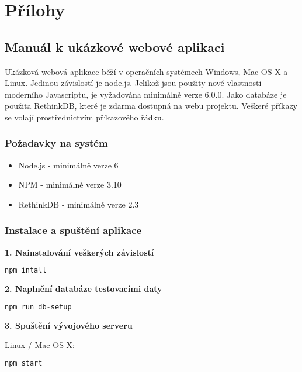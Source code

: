 \appendix
{}\thispagestyle{empty}  \renewcommand{\appendixname}{P\v{r}iloha}%


\part*{Přílohy}


\chapter[\noindent Manuál k ukázkové webové aplikaci]{\noindent Manuál k ukázkové webové aplikaci}

Ukázková webová aplikace běží v operačních systémech Windows, Mac OS X a Linux. Jedinou závislostí je node.js. Jelikož jsou použity nové vlastnosti moderního Javascriptu, je vyžadována minimálně verze 6.0.0. Jako databáze je použita RethinkDB, které je zdarma dostupná na webu projektu. Veškeré příkazy se volají prostřednictvím příkazového řádku.

\section*{Požadavky na systém}
\begin{itemize}
\item Node.js - minimálně verze 6
\item NPM - minimálně verze 3.10
\item RethinkDB - minimálně verze  2.3
\end{itemize}


\section*{Instalace a spuštění aplikace} 

\noindent\textbf{1. Nainstalování veškerých závislostí}

\begin{lstlisting}[language=Javascript]
npm intall
\end{lstlisting}

\noindent\textbf{2. Naplnění databáze testovacími daty}
\begin{lstlisting}[language=Javascript]
npm run db-setup
\end{lstlisting}

\noindent\textbf{3. Spuštění vývojového serveru}

\vspace{3mm}
Linux / Mac OS X:
\begin{lstlisting}[language=Javascript]
npm start
\end{lstlisting}

